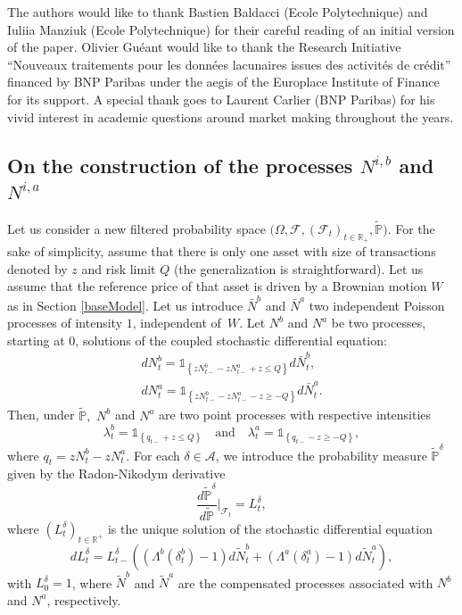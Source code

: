 \documentclass[preprint, 3p]{elsarticle}
\newcommand{\1}{{\chi}}
\begin{document}
The authors would like to thank Bastien Baldacci (Ecole Polytechnique) and Iuliia Manziuk (Ecole Polytechnique) for their careful reading of an initial version of the paper. Olivier Guéant would like to thank the Research Initiative ``Nouveaux traitements pour les données lacunaires issues des activités de crédit'' financed by BNP Paribas under the aegis of the Europlace Institute of Finance for its support. A special thank goes to Laurent Carlier (BNP Paribas) for his vivid interest in academic questions around market making throughout the years.\\

\begin{appendix}
\section{On the construction of the processes $N^{i,b}$ and $N^{i,a}$}
\label{ConstrucN}
Let us consider a new filtered probability space $\big(\Omega,\mathcal{F},(\mathcal{F}_t)_{t\in \mathbb{R}_{+}},\tilde{\mathbb{P}}\big)$. For the sake of simplicity, assume that there is only one asset with size of transactions denoted by $z$ and risk limit $Q$ (the generalization is straightforward). Let us assume that the reference price of that asset is driven by a Brownian motion $W$ as in Section \ref{baseModel}. Let us introduce $\bar{N}^b$ and $\bar{N}^a$ two independent Poisson processes of intensity $1$, independent of~$W$. Let $N^b$ and $N^a$ be two processes, starting at 0, solutions of the coupled stochastic differential equation:
\begin{align*}
    dN^b_t =  \mathds{1}_{\left\{zN^b_{t-} - zN^a_{t-} + z \le Q\right\}} d\bar{N}^b_t,\\
    dN^a_t =  \mathds{1}_{\left\{zN^b_{t-} - zN^a_{t-} -z \ge  -Q\right\}} d\bar{N}^a_t.
\end{align*}
Then, under $\tilde{\mathbb{P}},$ $N^b$ and $N^a$ are two point processes with respective intensities $$\lambda^b_t = \mathds{1}_{\left\{q_{t-} + z \le Q \right\}} \quad \text{and} \quad \lambda^a_t =  \mathds{1}_{\left\{q_{t-} - z \ge -Q\right\}},$$
where $q_t = z N^b_t -  z N^a_t.$ For each $\delta \in \mathcal{A}$, we introduce the probability measure $\tilde{\mathbb{P}}^\delta$ given by the Radon-Nikodym derivative
\begin{equation}
\frac{d\tilde{\mathbb{P}}^\delta}{d\tilde{\mathbb{P}}} \Big|_{\mathcal{F}_t} = L_t^{\delta},
\end{equation}
where $\left(L_t^{\delta} \right)_{t \in \mathbb R^+}$ is the unique solution of the stochastic differential equation
\begin{equation}
    dL_t^{\delta} = L_{t-}^{\delta} \left( \left(\Lambda^b(\delta^b_t)-1 \right)d\tilde{N}^b_t+  \left(\Lambda^a(\delta^a_t)-1 \right)d\tilde{N}^a_t \right),\nonumber
\end{equation}
with $L_0^{\delta} = 1$, where $\tilde{N}^b$ and $\tilde{N}^a$ are the compensated processes associated with $N^b$ and $N^a$, respectively.\\


\end{appendix}
\end{document}

